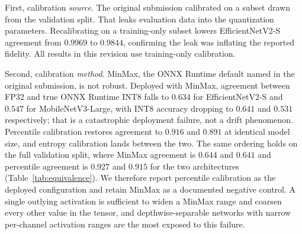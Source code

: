 \documentclass[fleqn,10pt]{wlscirep}
\begin{document}
First, calibration \emph{source}. The original submission calibrated on a subset drawn from the validation split. That leaks evaluation data into the quantization parameters. Recalibrating on a training-only subset lowers EfficientNetV2-S agreement from $0.9969$ to $0.9844$, confirming the leak was inflating the reported fidelity. All results in this revision use training-only calibration.

Second, calibration \emph{method}. MinMax, the ONNX Runtime default named in the original submission, is not robust. Deployed with MinMax, agreement between FP32 and true ONNX Runtime INT8 falls to $0.634$ for EfficientNetV2-S and $0.547$ for MobileNetV3-Large, with INT8 accuracy dropping to $0.641$ and $0.531$ respectively; that is a catastrophic deployment failure, not a drift phenomenon. Percentile calibration restores agreement to $0.916$ and $0.891$ at identical model size, and entropy calibration lands between the two. The same ordering holds on the full validation split, where MinMax agreement is $0.644$ and $0.641$ and percentile agreement is $0.927$ and $0.915$ for the two architectures (Table~\ref{tab:equivalence}). We therefore report percentile calibration as the deployed configuration and retain MinMax as a documented negative control. A single outlying activation is sufficient to widen a MinMax range and coarsen every other value in the tensor, and depthwise-separable networks with narrow per-channel activation ranges are the most exposed to this failure.
\end{document}

